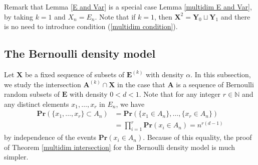 \documentclass{article}
\newcommand{\bs}{\boldsymbol}
\def\Pr{\mathbf{Pr}}
\theoremstyle{remark}
\begin{document}
Remark that Lemma \ref{E and Var} is a special case Lemma \ref{multidim E and Var}, by taking $k = 1$ and $X_n = E_n$. Note that if $k = 1$, then $\bs X^2 = \bs Y_0 \sqcup \bs Y_1$ and there is no need to introduce condition (\ref{multidim condition}).

\subsection{The Bernoulli density model}
Let $\bs X$ be a fixed sequence of subsets of $\bs E^{(k)}$ with density $\alpha$. In this subsection, we study the intersection $\bs A^{(k)}\cap \bs X$ in the case that $\bs A$ is a sequence of Bernoulli random subsets of $\bs E$ with density $0<d<1$. Note that for any integer $r\in \mathbb{N}$ and any distinct elements $x_1,\dots,x_r$ in $E_n$, we have
\begin{align*}
    \Pr\left(\{x_1,\dots,x_r\}\subset A_n\right) & = \Pr\left(\{x_1\in A_n\},\dots, \{x_r\in A_n\}\right)\\  & = \prod_{i=1}^r\Pr(x_i\in A_n) = n^{r(d-1)}
\end{align*}
by independence of the events $\Pr(x_i\in A_n)$. Because of this equality, the proof of Theorem \ref{multidim intersection} for the Bernoulli density model is much simpler.
\end{document}
